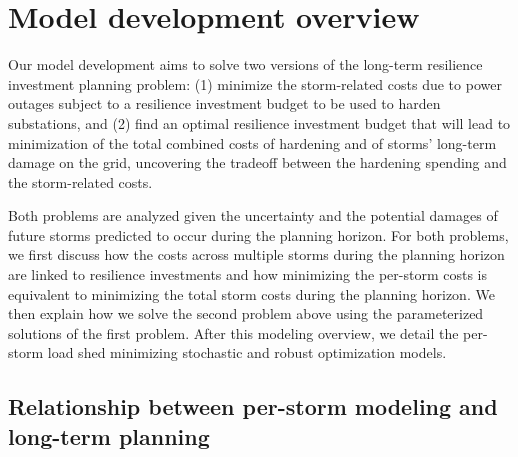 \documentclass[authoryear,preprint,review,12pt]{elsarticle}\usepackage{amssymb}
\begin{document}
\section{Model development overview} \label{model}

Our model development aims to solve two versions of the long-term resilience investment planning problem: (1) minimize the storm-related costs due to power outages subject to a resilience investment budget to be used to harden substations, and (2) find an optimal resilience investment budget that will lead to minimization of the total combined costs of hardening and of storms' long-term damage on the grid, uncovering the tradeoff between the hardening spending and the storm-related costs. 

Both problems are analyzed given the uncertainty and the potential damages of future storms predicted to occur during the planning horizon. For both problems, we first discuss how the costs across multiple storms during the planning horizon are linked to resilience investments and how minimizing the per-storm costs is equivalent to minimizing the total storm costs during the planning horizon. We then explain how we solve the second problem above using the parameterized solutions of the first problem. After this modeling overview, we detail the per-storm load shed minimizing stochastic and robust optimization models. 

\subsection{Relationship between per-storm modeling and long-term planning} \label{overview}
\end{document}
